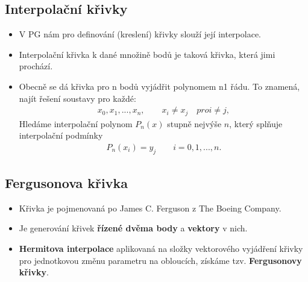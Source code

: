 \subsection{Interpolační křivky}
\begin{itemize}
	\item V PG nám pro definování (kreslení) křivky slouží její interpolace.
	\item Interpolační křivka k dané množině bodů je taková křivka, která jimi prochází.
	\item Obecně se dá křivka pro n bodů vyjádřit polynomem n1 řádu. To znamená, najít řešení soustavy pro každé:
	\begin{equation*}  
			\begin{array}{c}
			  x_{0},x_{1},...,x_{n},  \quad \quad x_{i} \neq x_{j} \quad pro  i \neq j,
			  \end{array}
			\end{equation*}
			Hledáme interpolační polynom $P_{n}(x)$ stupně nejvýše $n$, který splňuje interpolační podmínky
			\begin{equation*}  
			\begin{array}{c}
			  P_{n}(x_{i}) = y_{j} \quad \quad i = 0,1,...,n.
			  \end{array}
			\end{equation*}
	\end{itemize}

\subsection{Fergusonova křivka}
\begin{itemize}
	\item Křivka je pojmenovaná po James C. Ferguson z The Boeing Company.
	\item Je generování křivek \textbf{řízené dvěma body} a \textbf{vektory} v nich.
	\item \textbf{Hermitova interpolace} aplikovaná na složky vektorového vyjádření křivky pro jednotkovou změnu parametru na obloucích, získáme tzv. \textbf{Fergusonovy křivky}.
\end{itemize}

